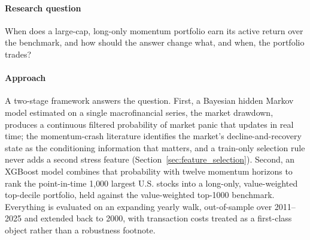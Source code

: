 \paragraph{Research question} When does a large-cap, long-only momentum portfolio earn its active return over the benchmark, and how should the answer change what, and when, the portfolio trades?

\paragraph{Approach} A two-stage framework answers the question. First, a Bayesian hidden Markov model estimated on a single macrofinancial series, the market drawdown, produces a continuous filtered probability of market panic that updates in real time; the momentum-crash literature identifies the market's decline-and-recovery state as the conditioning information that matters, and a train-only selection rule never adds a second stress feature (Section~\ref{sec:feature_selection}). Second, an XGBoost model combines that probability with twelve momentum horizons to rank the point-in-time 1{,}000 largest U.S. stocks into a long-only, value-weighted top-decile portfolio, held against the value-weighted top-1000 benchmark. Everything is evaluated on an expanding yearly walk, out-of-sample over 2011--2025 and extended back to 2000, with transaction costs treated as a first-class object rather than a robustness footnote.

